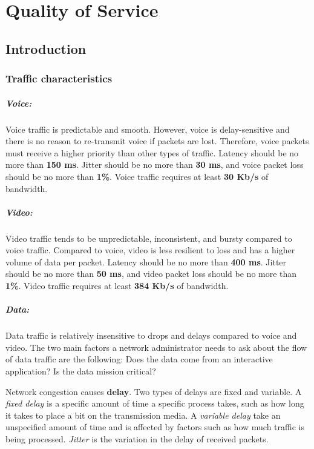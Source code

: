 \chapter{Quality of Service}

\section{Introduction}

\subsection{Traffic characteristics}

\paragraph{Voice:}Voice traffic is predictable and smooth. However, voice is delay-sensitive and there is no reason to re-transmit voice if packets are lost. Therefore, voice packets must receive a higher priority than other types of traffic. Latency should be no more than \textbf{150 ms}. Jitter should be no more than \textbf{30 ms}, and voice packet loss should be no more than \textbf{1\%}. Voice traffic requires at least \textbf{30 Kb/s} of bandwidth.

\paragraph{Video:}Video traffic tends to be unpredictable, inconsistent, and bursty compared to voice traffic. Compared to voice, video is less resilient to loss and has a higher volume of data per packet. Latency should be no more than \textbf{400 ms}. Jitter should be no more than \textbf{50 ms}, and video packet loss should be no more than \textbf{1\%}. Video traffic requires at least \textbf{384 Kb/s} of bandwidth.

\paragraph{Data:}Data traffic is relatively insensitive to drops and delays compared to voice and video. The two main factors a network administrator needs to ask about the flow of data traffic are the following: Does the data come from an interactive application? Is the data mission critical?

Network congestion causes \textbf{delay}. Two types of delays are fixed and variable. A \emph{fixed delay} is a specific amount of time a specific process takes, such as how long it takes to place a bit on the transmission media. A \emph{variable delay} take an unspecified amount of time and is affected by factors such as how much traffic is being processed. \emph{Jitter} is the variation in the delay of received packets.

